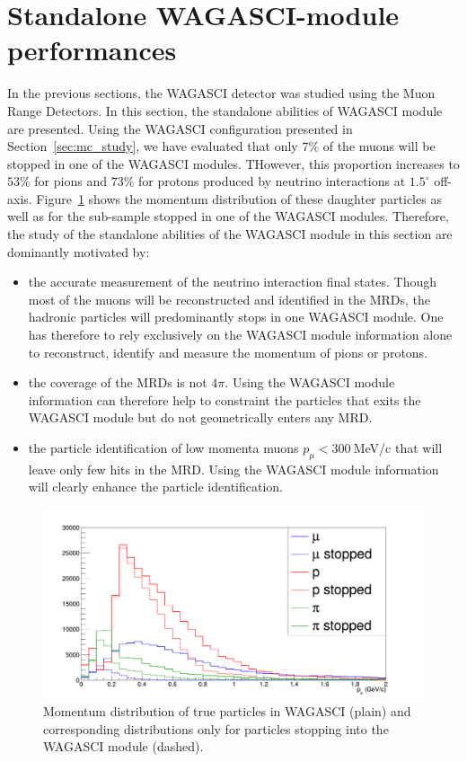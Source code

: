 \section{Standalone WAGASCI-module performances}
\label{sec:mc_study_standalone}

In the previous sections, the WAGASCI detector was studied using the Muon Range Detectors. In this section, the standalone abilities of WAGASCI module are presented. Using the WAGASCI configuration presented in Section~\ref{sec:mc_study}, we have evaluated that only $7\%$ of the muons will be stopped in one of the WAGASCI modules. THowever, this proportion increases to $53\%$ for pions and $73\%$ for protons produced by neutrino interactions at $1.5^{\circ}$ off-axis. Figure~\ref{fig:stoppedproportions} shows the momentum distribution of these daughter particles as well as for the sub-sample stopped in one of the WAGASCI modules. Therefore, the study of the standalone abilities of the WAGASCI module in this section are dominantly motivated by:
\begin{itemize}
\item the accurate measurement of the neutrino interaction final states. Though most of the muons will be reconstructed and identified in the MRDs, the hadronic particles will predominantly stops in one WAGASCI module. One has therefore to rely exclusively on the WAGASCI module information alone to reconstruct, identify and measure the momentum of pions or protons.
\item the coverage of the MRDs is not $4\pi$. Using the WAGASCI module information can therefore help to constraint the particles that exits the WAGASCI module but do not geometrically enters any MRD.
\item the particle identification of low momenta muons $p_{\mu} < 300~$MeV/c that will leave only few hits in the MRD. Using the WAGASCI module information will clearly enhance the particle identification.
\end{itemize}

\begin{figure}
  \centering
\includegraphics[width=.7\textwidth]{fig/StoppedProportionsMomentum.png}
\caption{\label{fig:stoppedproportions} Momentum distribution of true particles in WAGASCI (plain) and corresponding distributions only for particles stopping into the WAGASCI module (dashed).}
\end{figure}

